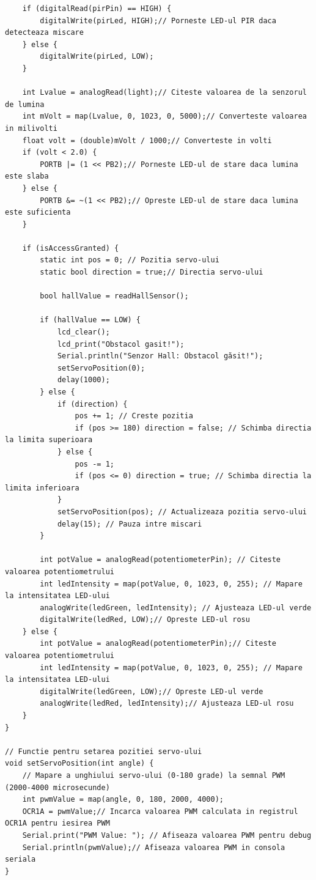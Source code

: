 \documentclass[a4paper,12pt]{report}
\begin{document}
\begin{lstlisting}
    if (digitalRead(pirPin) == HIGH) {
        digitalWrite(pirLed, HIGH);// Porneste LED-ul PIR daca detecteaza miscare
    } else {
        digitalWrite(pirLed, LOW);
    }

    int Lvalue = analogRead(light);// Citeste valoarea de la senzorul de lumina
    int mVolt = map(Lvalue, 0, 1023, 0, 5000);// Converteste valoarea in milivolti
    float volt = (double)mVolt / 1000;// Converteste in volti
    if (volt < 2.0) {
        PORTB |= (1 << PB2);// Porneste LED-ul de stare daca lumina este slaba
    } else {
        PORTB &= ~(1 << PB2);// Opreste LED-ul de stare daca lumina este suficienta
    }

    if (isAccessGranted) {
        static int pos = 0; // Pozitia servo-ului
        static bool direction = true;// Directia servo-ului
        
        bool hallValue = readHallSensor();
        
        if (hallValue == LOW) {
            lcd_clear();
            lcd_print("Obstacol gasit!");
            Serial.println("Senzor Hall: Obstacol găsit!");
            setServoPosition(0);
            delay(1000);
        } else {
            if (direction) {
                pos += 1; // Creste pozitia
                if (pos >= 180) direction = false; // Schimba directia la limita superioara
            } else {
                pos -= 1;
                if (pos <= 0) direction = true; // Schimba directia la limita inferioara
            }
            setServoPosition(pos); // Actualizeaza pozitia servo-ului
            delay(15); // Pauza intre miscari
        }

        int potValue = analogRead(potentiometerPin); // Citeste valoarea potentiometrului
        int ledIntensity = map(potValue, 0, 1023, 0, 255); // Mapare la intensitatea LED-ului
        analogWrite(ledGreen, ledIntensity); // Ajusteaza LED-ul verde
        digitalWrite(ledRed, LOW);// Opreste LED-ul rosu
    } else {
        int potValue = analogRead(potentiometerPin);// Citeste valoarea potentiometrului
        int ledIntensity = map(potValue, 0, 1023, 0, 255); // Mapare la intensitatea LED-ului
        digitalWrite(ledGreen, LOW);// Opreste LED-ul verde
        analogWrite(ledRed, ledIntensity);// Ajusteaza LED-ul rosu
    }
}

// Functie pentru setarea pozitiei servo-ului
void setServoPosition(int angle) {
    // Mapare a unghiului servo-ului (0-180 grade) la semnal PWM (2000-4000 microsecunde)
    int pwmValue = map(angle, 0, 180, 2000, 4000);
    OCR1A = pwmValue;// Incarca valoarea PWM calculata in registrul OCR1A pentru iesirea PWM
    Serial.print("PWM Value: "); // Afiseaza valoarea PWM pentru debug
    Serial.println(pwmValue);// Afiseaza valoarea PWM in consola seriala
}
\end{lstlisting}
\end{document}
